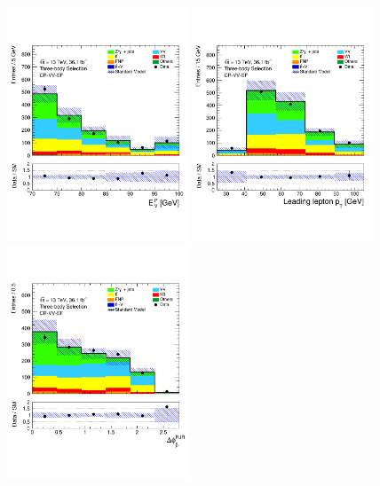 \begin{figure}[!htb]
    \begin{center}
        \includegraphics[width=0.48\textwidth]{figures/search_stop2l/bkg_est/crvsf/crvSF_MDR}
        \includegraphics[width=0.48\textwidth]{figures/search_stop2l/bkg_est/crvsf/crvSF_l_pt0}
        \includegraphics[width=0.48\textwidth]{figures/search_stop2l/bkg_est/crvsf/crvSF_DPB_vSS}

\end{center}
\end{figure}
